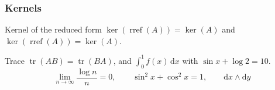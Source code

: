 \documentclass{beamer}
\DeclareMathOperator{\rref}{rref}
\begin{document}
\begin{frame}
  \frametitle{Kernels}
  \begin{block}{Kernel of the reduced form}
    $\ker(\operatorname{rref}(A)) = \ker(A)$ and $\ker(\rref(A)) = \ker(A)$.
  \end{block}
  Trace $\operatorname{tr}(AB) = \operatorname{tr}(BA)$, and
  $\int_0^1 f(x)\,\mathrm{d}x$ with $\sin x + \log 2 = 10$.
  \[
    \lim_{n\to\infty} \frac{\log n}{n} = 0, \qquad
    \sin^2 x + \cos^2 x = 1, \qquad
    \mathrm{d}x \wedge \mathrm{d}y
  \]
\end{frame}
\end{document}
